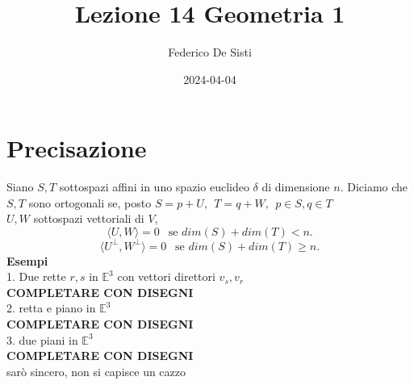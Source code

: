 \documentclass[12px]{article}
\title{Lezione 14 Geometria 1}
\date{2024-04-04}
\author{Federico De Sisti}
\begin{document}
	\maketitle
	\newpage
	\section{Precisazione}
	Siano $S,T$ sottospazi affini in uno spazio euclideo $\delta$ di dimensione $n$. Diciamo che $S,T$ sono ortogonali se, posto $S = p + U, \ \ T= q + W, \ \ p\in S,q\in T$\\
	 $U,W$ sottospazi vettoriali di $V$,
	 \[
		 \langle U, W \rangle = 0\ \ \text{ se } dim(S) + dim(T) < n
	 .\] 
	 \[
		 \langle U^\perp, W^\perp \rangle  = 0 \ \ \text{ se } dim(S) + dim(T) \geq n
	 .\] 
	 \textbf{Esempi}\\
	 1. Due rette $r, s$ in $\mathbb{E}^3$ con vettori direttori $v_s, v_r$ \\
	 \textbf{COMPLETARE CON DISEGNI}\\
	2. retta e piano in $\mathbb{E}^3$\\
	\textbf{COMPLETARE CON DISEGNI}\\
	3. due piani in $\mathbb{E}^3$\\
	\textbf{COMPLETARE CON DISEGNI}\\
	sarò sincero, non si capisce un cazzo
\end{document}
